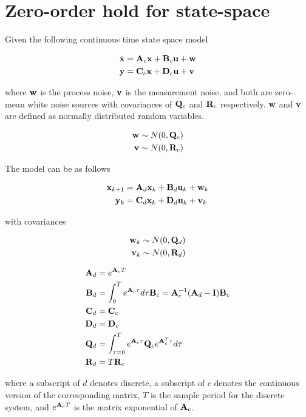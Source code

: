 \section{Zero-order hold for state-space}

Given the following continuous time state space model

\begin{align*}
  \dot{\mathbf{x}} &= \mathbf{A}_c\mathbf{x} + \mathbf{B}_c\mathbf{u} + \mathbf{w} \\
  \mathbf{y} &= \mathbf{C}_c\mathbf{x} + \mathbf{D}_c\mathbf{u} + \mathbf{v}
\end{align*}

where $\mathbf{w}$ is the process noise, $\mathbf{v}$ is the measurement noise, and
both are zero-mean white noise sources with covariances of $\mathbf{Q}_c$ and
$\mathbf{R}_c$ respectively. $\mathbf{w}$ and $\mathbf{v}$ are defined as normally
distributed random variables.

\begin{align*}
  \mathbf{w} &\sim N(0, \mathbf{Q}_c) \\
  \mathbf{v} &\sim N(0, \mathbf{R}_c)
\end{align*}

The model can be  as follows

\begin{align*}
  \mathbf{x}_{k+1} &= \mathbf{A}_d \mathbf{x}_k + \mathbf{B}_d \mathbf{u}_k + \mathbf{w}_k \\
   \mathbf{y}_k &= \mathbf{C}_d \mathbf{x}_k + \mathbf{D}_d \mathbf{u}_k + \mathbf{v}_k
\end{align*}

with covariances

\begin{align*}
  \mathbf{w}_k &\sim N(0, \mathbf{Q}_d) \\
  \mathbf{v}_k &\sim N(0, \mathbf{R}_d)
\end{align*}

\begin{theorem}
  \label{thm:zoh_ss}

  \begin{align}
    \mathbf{A}_d &= e^{\mathbf{A}_c T} \\
    \mathbf{B}_d &= \int_0^T e^{\mathbf{A}_c \tau} d\tau \mathbf{B}_c =
      \mathbf{A}_c^{-1} (\mathbf{A}_d - \mathbf{I}) \mathbf{B}_c \\
    \mathbf{C}_d &= \mathbf{C}_c \\
    \mathbf{D}_d &= \mathbf{D}_c \\
    \mathbf{Q}_d &= \int_{\tau = 0}^{T} e^{\mathbf{A}_c\tau} \mathbf{Q}_c
      e^{\mathbf{A}_c^T\tau} d\tau \\
    \mathbf{R}_d &= T\mathbf{R}_c
  \end{align}

  where a subscript of $d$ denotes discrete, a subscript of $c$ denotes the
  continuous version of the corresponding matrix, $T$ is the sample period for
  the discrete \gls{system}, and $e^{\mathbf{A}_c T}$ is the matrix exponential of
  $\mathbf{A}_c$.
\end{theorem}

